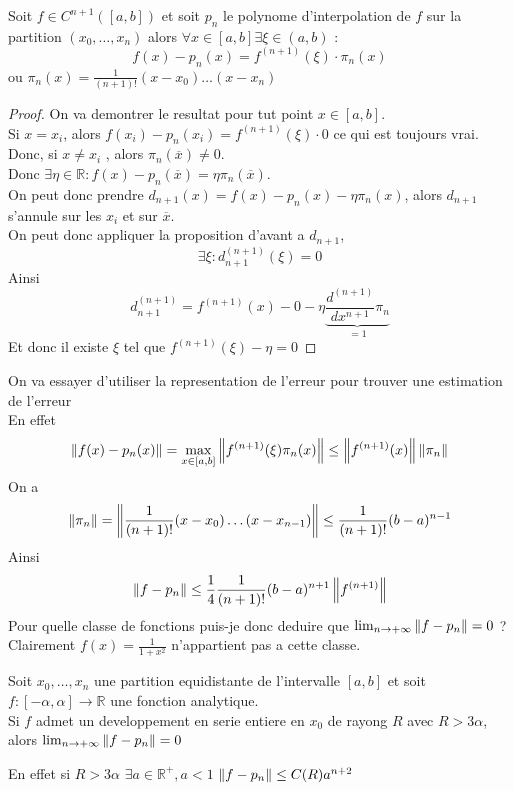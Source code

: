\documentclass[../main.tex]{subfiles}
\begin{document}
\begin{thm}
	Soit $f\in C^{n+1}( [ a,b] ) $ et soit $p_n$ le polynome d'interpolation de $f$ sur la partition $( x_0,\ldots,x_n) $ alors $\forall x \in [ a,b] \exists \xi \in ( a,b) $ :
	\[ 
	f( x) - p_n( x) = f^{( n+1) }( \xi) \cdot \pi_n( x) 
	\]
	ou $\pi_n( x) = \frac{1}{( n+1) !}( x-x_0) \ldots ( x-x_n) $ 
\end{thm}
\begin{proof}
	On va demontrer le resultat pour tut point $x\in [ a,b] $.\\
	Si $x=x_i$, alors $f( x_i) -p_n( x_i) = f^{( n+1) }( \xi) \cdot 0$ ce qui est toujours vrai.\\
	Donc, si $x\neq x_i$ , alors $\pi_n( \overline{x}) \neq 0$.\\
	Donc $\exists \eta\in \mathbb{R}: f( x)-p_n( \overline{x}) = \eta\pi_n( \overline{x})  $.\\
	On peut donc prendre $d_{n+1} ( x) = f( x) -p_n( x) -\eta \pi_n( x) $, alors $d_{n+1} $ s'annule sur les $x_i$ et sur $ \overline{x}$.\\
	On peut donc appliquer la proposition d'avant a $d_{n+1} $,
	\[ 
	\exists \xi: d_{n+1} ^{( n+1) }( \xi) =0
	\]
	Ainsi
	\[ 
d_{n+1} ^{( n+1) }= f^{( n+1) }( x) - 0 - \eta \underbrace{\frac{d^{( n+1) }}{dx^{n+1}} \pi_n}_{=1}
	\]
	Et donc il existe $\xi$ tel que $f^{( n+1) }( \xi) - \eta= 0$ 	
	
\end{proof}
On va  essayer d'utiliser la representation de l'erreur pour trouver une estimation de l'erreur\\
En effet
\[ 
	\left\lVert f( x) - p_n( x) \right\rVert = \max_{x\in [ a,b] } \left\lVert f^{( n+1) }( \xi) \pi_n( x) \right\rVert \leq  \left\lVert f^{( n+1) }( x) \right\rVert \left\lVert\pi_n\right\rVert
\]
On a 
\[ 
\left\lVert \pi_n\right\rVert = \left\lVert \frac{1}{( n+1) !}( x-x_0) \ldots ( x-x_{n-1} ) \right\rVert \leq  \frac{1}{( n+1) !}( b-a)^{n-1}
\]
Ainsi
\[ 
\left\lVert f-p_n\right\rVert \leq \frac{1}{4} \frac{1}{( n+1) !}( b-a)^{n+1}\left\lVert f^{( n+1) }\right\rVert 
\]
Pour quelle classe de fonctions puis-je donc deduire que $ \lim_{n \to  + \infty} \left\lVert f-p_n\right\rVert =0$ ?\\
Clairement $f( x) = \frac{1}{1+x^{2}}$ n'appartient pas a cette classe.
\begin{thm}
	Soit $x_0,\ldots,x_n$ une partition equidistante de l'intervalle $ [ a,b] $ et soit $f: [ -\alpha,\alpha] \to \mathbb{R}$ une fonction analytique.\\
	Si $f$ admet un developpement en serie entiere en $x_0$ de rayong $R$ avec $R > 3\alpha$, alors $ \lim_{n \to  + \infty} \left\lVert f-p_n\right\rVert =0$ 
\end{thm}
En effet si $R> 3\alpha$ $\exists a\in \mathbb{R}^{+}, a<1$ $ \left\lVert f-p_n\right\rVert \leq C( R) a^{n+2}$ 	

		
\end{document}
